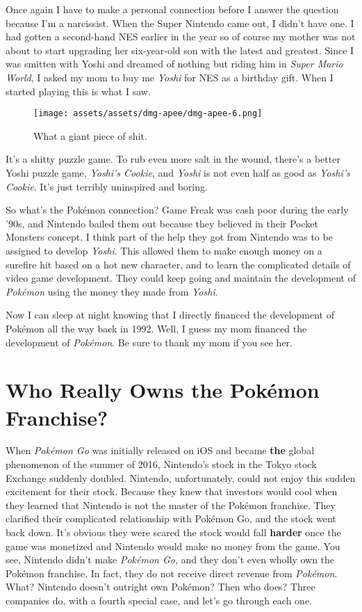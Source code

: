 \documentclass{book}
\begin{document}
Once again I have to make a personal connection before I answer the question because I’m a narcissist. When the Super Nintendo came out, I didn’t have one. I had gotten a second-hand NES earlier in the year so of course my mother was not about to start upgrading her six-year-old son with the latest and greatest. Since I was smitten with Yoshi and dreamed of nothing but riding him in \emph{Super Mario World}, I asked my mom to buy me \emph{Yoshi} for NES as a birthday gift. When I started playing this is what I saw.

\begin{figure}[hbt]
\vskip 10pt
\centering \texttt{[image: assets/assets/dmg-apee/dmg-apee-6.png]}\par\pagetwodescription What a giant piece of shit.
\vskip 6pt
\end{figure}

It’s a shitty puzzle game. To rub even more salt in the wound, there’s a better Yoshi puzzle game, \emph{Yoshi’s Cookie}, and \emph{Yoshi} is not even half as good as \emph{Yoshi’s Cookie}. It’s just terribly uninspired and boring.

So what’s the Pokémon connection? Game Freak was cash poor during the early ’90s, and Nintendo bailed them out because they believed in their Pocket Monsters concept. I think part of the help they got from Nintendo was to be assigned to develop \emph{Yoshi}. This allowed them to make enough money on a surefire hit based on a hot new character,
 and to learn the complicated details of video game development. They could keep going and maintain the development of \emph{Pokémon} using the money they made from \emph{Yoshi}.

Now I can sleep at night knowing that I directly financed the development of Pokémon all the way back in 1992. Well, I guess my mom financed the development of \emph{Pokémon}. Be sure to thank my mom if you see her.

\FloatBarrier\needspace{10mm}\section*{Who Really Owns the Pokémon Franchise?}\nopagebreak[4]

When \emph{Pokémon Go} was initially released on iOS and became \textbf{the} global phenomenon of the summer of 2016, Nintendo’s stock in the Tokyo stock Exchange suddenly doubled. Nintendo, unfortunately, could not enjoy this sudden excitement for their stock. Because they knew that investors would cool when they learned that Nintendo is not the master of the Pokémon franchise. They clarified their complicated relationship with Pokémon Go, and the stock went back down. It’s obvious they were scared the stock would fall \textbf{harder} once the game was monetized and Nintendo would make no money from the game. You see, Nintendo didn’t make \emph{Pokémon Go}, and they don’t even wholly own the Pokémon franchise. In fact, they do not receive direct revenue from \emph{Pokémon}. What? Nintendo doesn’t outright own Pokémon? Then who does? Three companies do, with a fourth special case, and let’s go through each one.
\end{document}
